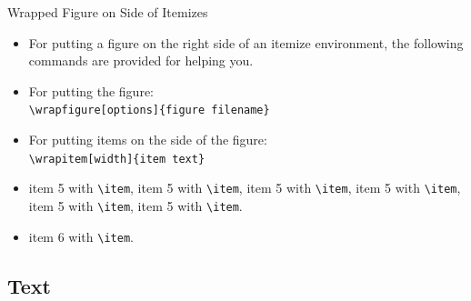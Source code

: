 \documentclass[english,sectioncirclenumberstyle]{ciadbeamer}
\begin{document}
\begin{frame}{{Wrapped Figure} on Side of Itemizes}
	\begin{itemize}
	\item For putting a figure on the right side of an itemize environment, the following commands are provided for helping you.
	\item For putting the figure: \\
			\texttt{{\textbackslash}wrapfigure[options]\{figure filename\}}
	\item For putting items on the side of the figure: \\
			\texttt{{\textbackslash}wrapitem[width]\{item text\}}
	\end{itemize}
	\begin{example}\tiny
		\begin{itemize}
		\item{item 5 with \texttt{{\textbackslash}item}, item 5 with \texttt{{\textbackslash}item}, item 5 with \texttt{{\textbackslash}item}, item 5 with \texttt{{\textbackslash}item}, item 5 with \texttt{{\textbackslash}item}, item 5 with \texttt{{\textbackslash}item}.}
		\item item 6 with \texttt{{\textbackslash}item}. 
		\end{itemize}
	\end{example}
\end{frame}

\subsection{Text}
\subsectiontableofcontentslide
\end{document}
